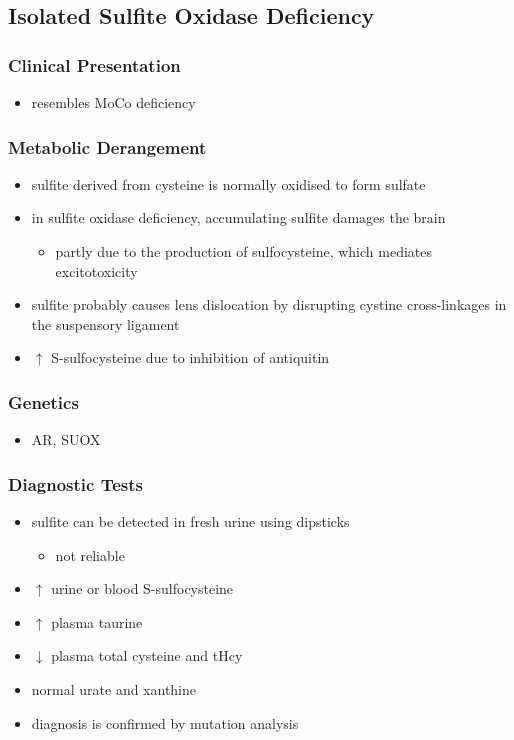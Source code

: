 \documentclass{scrartcl}
\begin{document}
\subsection{Isolated Sulfite Oxidase Deficiency}
\label{sec:org19df007}
\subsubsection{Clinical Presentation}
\label{sec:org902a890}
\begin{itemize}
\item resembles MoCo deficiency
\end{itemize}
\subsubsection{Metabolic Derangement}
\label{sec:org54a51e3}
\begin{itemize}
\item sulfite derived from cysteine is normally oxidised to form
sulfate
\item in sulfite oxidase deficiency, accumulating sulfite damages the brain
\begin{itemize}
\item partly due to the production of sulfocysteine, which
mediates excitotoxicity
\end{itemize}
\item sulfite probably causes lens dislocation by disrupting cystine
cross-linkages in the suspensory ligament
\item \(\uparrow\) S-sulfocysteine due to inhibition of antiquitin
\end{itemize}
\subsubsection{Genetics}
\label{sec:org69e1c6e}
\begin{itemize}
\item AR, SUOX
\end{itemize}

\subsubsection{Diagnostic Tests}
\label{sec:orgc1618b5}
\begin{itemize}
\item sulfite can be detected in fresh urine using dipsticks
\begin{itemize}
\item not reliable
\end{itemize}
\item \(\uparrow\) urine or blood S-sulfocysteine
\item \(\uparrow\) plasma taurine
\item \(\downarrow\) plasma total cysteine and tHcy
\item normal urate and xanthine
\item diagnosis is confirmed by mutation analysis
\end{itemize}
\end{document}
